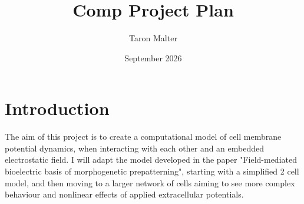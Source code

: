 \documentclass{article}
\title{Comp Project Plan}
\author{Taron Malter}
\date{September 2026}
\begin{document}
\maketitle

\section*{Introduction}

The aim of this project is to create a computational model of cell membrane potential dynamics, when interacting with each other and an embedded electrostatic field. I will adapt the model developed in the paper "Field-mediated bioelectric basis of morphogenetic prepatterning", starting with a simplified 2 cell model, and then moving to a larger network of cells aiming to see more complex behaviour and nonlinear effects of applied extracellular potentials. 

\hfill\break 
\hfill\break
\end{document}
